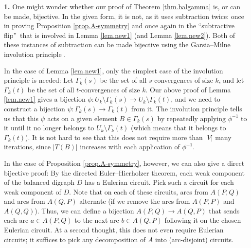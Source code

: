 \documentclass[numbers=enddot,12pt,final,onecolumn,notitlepage]{scrartcl}%
\theoremstyle{definition}
\theoremstyle{plainsl}
\begin{document}
\hspace{\parindent} \textbf{1.} One might wonder whether our proof of Theorem
\ref{thm.balgamma} is, or can be made, bijective. In the given form, it is
not, as it uses subtraction twice: once in proving Proposition
\ref{prop.A-symmetry} and once again in the \textquotedblleft subtractive
flip\textquotedblright\ that is involved in Lemma \ref{lem.new1} (and Lemma
\ref{lem.new2}). Both of these instances of subtraction can be made bijective
using the Garsia--Milne involution principle \cite[\S 4.6]{StaWhi86}.

In the case of Lemma \ref{lem.new1}, only the simplest case of the involution
principle is needed: Let $\Gamma_{k}\left(  s\right)  $ be the set of all
$s$-convergences of size $k$, and let $\Gamma_{k}\left(  t\right)  $ be the
set of all $t$-convergences of size $k$. Our above proof of Lemma
\ref{lem.new1} gives a bijection $\phi:U_{k}\setminus\Gamma_{k}\left(
s\right)  \rightarrow U_{k}\setminus\Gamma_{k}\left(  t\right)  $, and we need
to construct a bijection $\psi:\Gamma_{k}\left(  s\right)  \rightarrow
\Gamma_{k}\left(  t\right)  $ from it. The involution principle tells us that
this $\psi$ acts on a given element $B\in\Gamma_{k}\left(  s\right)  $ by
repeatedly applying $\phi^{-1}$ to it until it no longer belongs to
$U_{k}\setminus\Gamma_{k}\left(  t\right)  $ (which means that it belongs to
$\Gamma_{k}\left(  t\right)  $). It is not hard to see that this does not
require more than $\left\vert V\right\vert $ many iterations, since
$\left\vert T\left(  B\right)  \right\vert $ increases with each application
of $\phi^{-1}$.

In the case of Proposition \ref{prop.A-symmetry}, however, we can also give a
direct bijective proof: By the directed Euler--Hierholzer theorem, each weak
component of the balanced digraph $D$ has a Eulerian circuit. Pick such a
circuit for each weak component of $D$. Note that on each of these circuits,
arcs from $A\left(  P,Q\right)  $ and arcs from $A\left(  Q,P\right)  $
alternate (if we remove the arcs from $A\left(  P,P\right)  $ and $A\left(
Q,Q\right)  $). Thus, we can define a bijection $A\left(  P,Q\right)
\rightarrow A\left(  Q,P\right)  $ that sends each arc $a\in A\left(
P,Q\right)  $ to the next arc $b\in A\left(  Q,P\right)  $ following it on the
chosen Eulerian circuit. At a second thought, this does not even require
Eulerian circuits; it suffices to pick any decomposition of $A$ into
(arc-disjoint) circuits.

\bigskip
\end{document}
